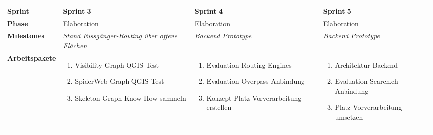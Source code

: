 \begin{landscape}
\begin{longtable}{l p{5.5cm} p{5.5cm} p{5.5cm}}
        \pagebreak
        \toprule
        \textbf{Sprint}
                                & \textbf{Sprint 3}
                                & \textbf{Sprint 4}
                                & \textbf{Sprint 5} \\
        
        \midrule
        \textbf{Phase}
                                & Elaboration
                                & Elaboration
                                & Elaboration \\
        
        \textbf{Milestones}
                                & \textit{Stand Fussgänger-Routing über offene Flächen}
                                & \textit{Backend Prototype}
                                & \textit{Backend Prototype}  \\
        
        \textbf{Arbeitspakete}
                                & \begin{enumerate}[noitemsep]
                                    \item Visibility-Graph QGIS Test
                                    \item SpiderWeb-Graph QGIS Test
                                    \item Skeleton-Graph Know-How sammeln
                                \end{enumerate}
                                & \begin{enumerate}[noitemsep]
                                    \item Evaluation Routing Engines
                                    \item Evaluation Overpass Anbindung
                                    \item Konzept Platz-Vorverarbeitung erstellen
                                \end{enumerate}
                                & \begin{enumerate}[noitemsep]
                                    \item Architektur Backend
                                    \item Evaluation Search.ch Anbindung
                                    \item Platz-Vorverarbeitung umsetzen
                                \end{enumerate}  \\
        

\end{longtable}
\end{landscape}
